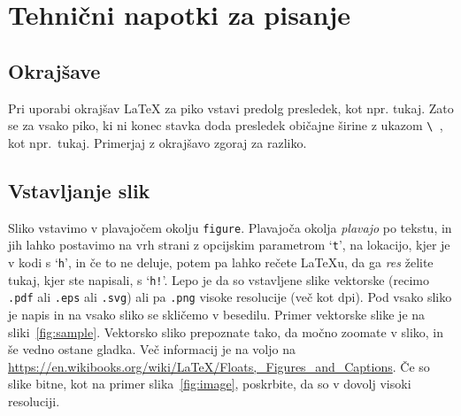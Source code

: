 \documentclass[mat2, tisk]{fmfdelo}
\begin{document}
\section{Tehnični napotki za pisanje}



\subsection{Okrajšave}
Pri uporabi okrajšav \LaTeX{} za piko vstavi predolg presledek, kot npr. tukaj. Zato se za vsako
piko, ki ni konec stavka doda presledek običajne širine z ukazom \verb*|\ |, kot npr.\ tukaj.
Primerjaj z okrajšavo zgoraj za razliko.

\subsection{Vstavljanje slik}
Sliko vstavimo v plavajočem okolju \texttt{figure}. Plavajoča okolja \emph{plavajo} po tekstu, in
jih lahko postavimo na vrh strani z opcijskim parametrom `\texttt{t}', na lokacijo, kjer je v kodi s
`\texttt{h}', in če to ne deluje, potem pa lahko rečete \LaTeX u, da ga \emph{res} želite tukaj,
kjer ste napisali, s `\texttt{h!}'. Lepo je da so vstavljene slike vektorske (recimo \texttt{.pdf}
ali \texttt{.eps} ali \texttt{.svg}) ali pa \texttt{.png} visoke resolucije (več kot
\unit[300]{dpi}).  Pod vsako sliko je napis in na vsako sliko se skličemo v besedilu. Primer
vektorske slike je na sliki~\ref{fig:sample}. Vektorsko sliko prepoznate tako, da močno
zoomate v sliko, in še vedno ostane gladka. Več informacij je na voljo na
\url{https://en.wikibooks.org/wiki/LaTeX/Floats,_Figures_and_Captions}. Če so slike bitne, kot na
primer slika~\ref{fig:image}, poskrbite, da so v dovolj visoki resoluciji.
\end{document}
